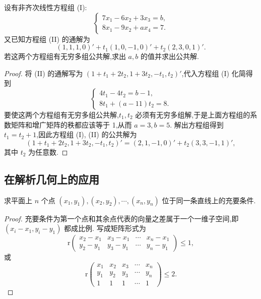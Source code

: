 \documentclass[../../main.tex]{subfiles}%
\begin{document}
\begin{example}
设有非齐次线性方程组 (I):
\[
\begin{cases}
7x_1 - 6x_2 + 3x_3 = b,\\
8x_1 - 9x_2 + ax_4 = 7.
\end{cases}
\]
又已知方程组 (II) 的通解为
\[
(1,1,1,0)' + t_1(1,0,-1,0)' + t_2(2,3,0,1)'.
\]
若这两个方程组有无穷多组公共解,求出 \(a,b\) 的值并求出公共解.
\end{example}
\begin{proof}

将 (II) 的通解写为 \((1 + t_1 + 2t_2,1 + 3t_2,-t_1,t_2)'\),代入方程组 (I) 化简得到
\[
\begin{cases}
4t_1 - 4t_2 = b - 1,\\
8t_1 + (a - 11)t_2 = 8.
\end{cases}
\]
要使这两个方程组有无穷多组公共解,\(t_1,t_2\) 必须有无穷多组解,于是上面方程组的系数矩阵和增广矩阵的秩都应该等于 1,从而 \(a = 3,b = 5\). 解出方程组得到 \(t_1 = t_2 + 1\),因此方程组 (I), (II) 的公共解为
\[
(1 + t_1 + 2t_2,1 + 3t_2,-t_1,t_2)' = (2,1,-1,0)' + t_2(3,3,-1,1)',
\]
其中 \(t_2\) 为任意数.

\end{proof}

\subsection{在解析几何上的应用}

\begin{proposition}\label{proposition:平面上点位于同一条直线上的充要条件}
求平面上 \(n\) 个点 \((x_1,y_1),(x_2,y_2),\cdots,(x_n,y_n)\) 位于同一条直线上的充要条件.
\end{proposition}
\begin{proof}

充要条件为第一个点和其余点代表的向量之差属于一个一维子空间,即 \((x_i - x_1,y_i - y_1)\) 都成比例. 写成矩阵形式为
\[
\mathrm{r}\begin{pmatrix}
x_2 - x_1&x_3 - x_1&\cdots&x_n - x_1\\
y_2 - y_1&y_3 - y_1&\cdots&y_n - y_1
\end{pmatrix}\leqslant 1,
\]
或
\[
\mathrm{r}\begin{pmatrix}
x_1&x_2&x_3&\cdots&x_n\\
y_1&y_2&y_3&\cdots&y_n\\
1&1&1&\cdots&1
\end{pmatrix}\leqslant 2. 
\]

\end{proof}
\end{document}
